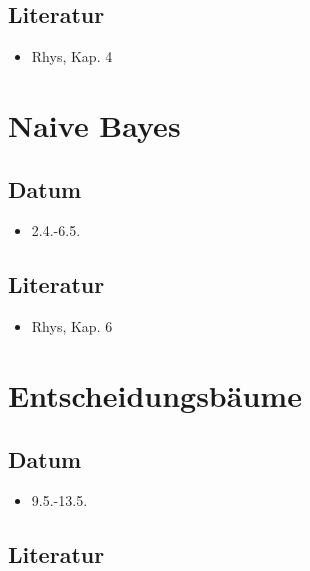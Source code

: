 \documentclass[
]{book}
\providecommand{\tightlist}{%
  \setlength{\itemsep}{0pt}\setlength{\parskip}{0pt}}
\begin{document}
\hypertarget{literatur-6}{%
\subsection{Literatur}\label{literatur-6}}

\begin{itemize}
\tightlist
\item
  Rhys, Kap. 4
\end{itemize}

\hypertarget{naive-bayes}{%
\section{Naive Bayes}\label{naive-bayes}}

\hypertarget{datum-7}{%
\subsection{Datum}\label{datum-7}}

\begin{itemize}
\tightlist
\item
  2.4.-6.5.
\end{itemize}

\hypertarget{literatur-7}{%
\subsection{Literatur}\label{literatur-7}}

\begin{itemize}
\tightlist
\item
  Rhys, Kap. 6
\end{itemize}

\hypertarget{entscheidungsbuxe4ume}{%
\section{Entscheidungsbäume}\label{entscheidungsbuxe4ume}}

\hypertarget{datum-8}{%
\subsection{Datum}\label{datum-8}}

\begin{itemize}
\tightlist
\item
  9.5.-13.5.
\end{itemize}

\hypertarget{literatur-8}{%
\subsection{Literatur}\label{literatur-8}}
\end{document}
